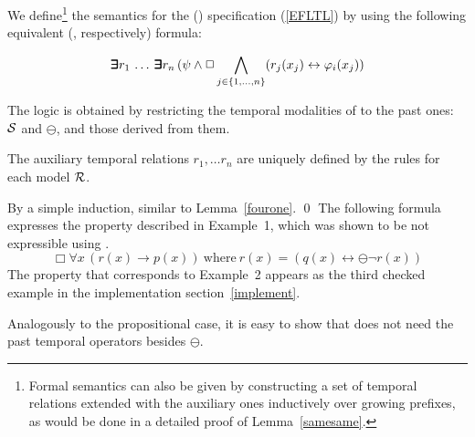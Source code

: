 \noindent
We define\footnote{ Formal semantics 
can also be given by constructing a set of temporal relations extended
with the auxiliary ones
inductively over growing prefixes, as would be done in a detailed proof of Lemma~\ref{samesame}.} the semantics for the \EFLTL{} (\EPFLTL{})
specification (\ref{EFLTL}) 
by using the following equivalent
\QFLTL{} (\QPFLTL{}, respectively) formula:

\begin{equation} \label{equiv}
\bm{\exists}\kern-0.6em\bm{\exists} r_1  \, \ldots \, \bm{\exists}\kern-0.6em\bm{\exists} r_n \,  ( \psi \wedge \Box \bigwedge_{j \in \{ 1, \ldots , n\}} (r_j ( x_j )  \leftrightarrow 
\varphi_i ( x_j) )
\end{equation}

The logic \EPFLTL{} is obtained by restricting the temporal modalities of \EFLTL{} to the past ones:
${\cal S}$ and $\ominus$, and those derived from them.

\begin{lemma} \label{samesame}
The auxiliary temporal relations $r_1, \ldots r_n$ are
uniquely defined by the rules for each model ${\cal R}$.
\end{lemma}
 By a simple induction, similar to Lemma~\ref{fourone}. \qed
\vspace{1ex}
The following formula expresses the property described in Example~1, which was shown to be 
not expressible using \FLTL{}.
\begin{equation}
\Box \forall x \, (r(x)\rightarrow p(x)) \mathrm{\ where\ }
r(x) = ( q(x) \leftrightarrow \ominus \neg  r(x)) 
\label{eq:wolper-first-order}
\end{equation}
The property that corresponds to Example~2 appears as the third checked example in the implementation section~\ref{implement}.




Analogously to the propositional case, it is easy to show that \EPFLTL{} does not
need the past temporal operators besides $\ominus$.





